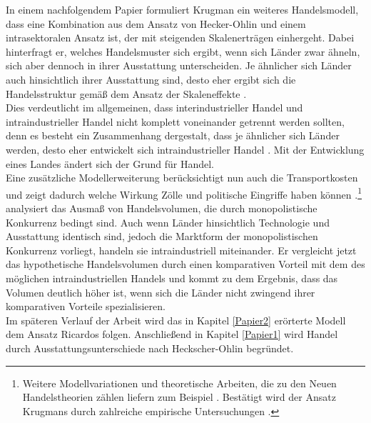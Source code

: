 %
In einem nachfolgendem Papier \cite{Krugman.1979b} formuliert Krugman ein weiteres Handelsmodell, dass eine Kombination aus dem Ansatz von Hecker-Ohlin und einem intrasektoralen Ansatz ist, der mit steigenden Skalenerträgen einhergeht. Dabei hinterfragt er, welches Handelsmuster sich ergibt, wenn sich Länder zwar ähneln, sich aber dennoch in ihrer Ausstattung unterscheiden. Je ähnlicher sich Länder  auch hinsichtlich ihrer Ausstattung sind, desto eher ergibt sich die Handelsstruktur gemäß dem Ansatz der Skaleneffekte \cite{Krugman.79}.\\
%
Dies verdeutlicht im allgemeinen, dass interindustrieller Handel und intraindustrieller Handel  nicht komplett voneinander getrennt werden sollten, denn es besteht ein Zusammenhang dergestalt, dass je ähnlicher sich Länder werden, desto eher entwickelt sich intraindustrieller Handel \cite{Krugman.1981}. Mit der Entwicklung eines Landes ändert sich der Grund für Handel.\\
%
Eine zusätzliche Modellerweiterung berücksichtigt nun auch die Transport\-ko\-sten und zeigt dadurch welche Wirkung Zölle und politische Eingriffe haben können \cite{Krugman.1980}.\footnote{Weitere Modellvariationen und theoretische Arbeiten, die zu den Neuen Handelstheorien zählen liefern zum Beispiel \cite{Grossman.1991b}.
Bestätigt wird der Ansatz Krugmans durch zahlreiche empirische Untersuchungen \cite{Antweiler.2002}.}\\
\cite{Lancaster.1980} analysiert das Ausmaß von Handelsvolumen, die durch monopolistische Konkurrenz bedingt sind. Auch wenn Länder hinsichtlich Technologie und Ausstattung identisch sind, jedoch die Marktform der monopolistischen Konkurrenz vorliegt, handeln sie intraindustriell miteinander. Er vergleicht jetzt das hypothetische Handelsvolumen durch einen komparativen Vorteil mit dem des möglichen  intraindustriellen Handels und kommt zu dem Ergebnis, dass das Volumen deutlich höher ist, wenn sich die Länder nicht zwingend ihrer komparativen Vorteile spezialisieren.\\
%
Im späteren Verlauf der Arbeit wird das in Kapitel \ref{Papier2} erörterte Modell dem Ansatz Ricardos folgen. Anschließend in Kapitel \ref{Papier1} wird Handel durch Ausstattungsunterschiede nach Heckscher-Ohlin begründet.
%
